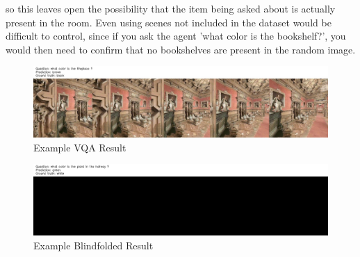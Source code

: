 so this leaves open the possibility that the item being asked about is actually present in the room. Even using scenes not included in the dataset would be difficult to control, since if you ask the agent 'what color is the bookshelf?', you would then need to confirm that no bookshelves are present in the random image. \newline


\begin{figure}[ht!]
	\centering
        \includegraphics[width=\textwidth]{./figure/results/baseline_and_blindfolding/images/ckpt_23_781_image.jpg}
	\caption{Example VQA Result} %
	\label{fig:example_vqa_result}
\end{figure}
	

\begin{figure}[ht!]
	\centering
        \includegraphics[width=\textwidth]{./figure/results/baseline_and_blindfolding/blindfolded/ckpt_23_1250_image.jpg}
	\caption{Example Blindfolded Result}
	\label{fig:example_blindfolded_result}
\end{figure}

